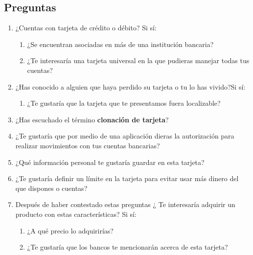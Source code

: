 \documentclass[11pt]{book}
\begin{document}
\subsection{Preguntas}
\begin{enumerate}
	\item ¿Cuentas con tarjeta de crédito o débito? Si sí:
		\begin{enumerate}
			\item ¿Se encuentran asociadas en más de una institución bancaria?
			\item ¿Te interesaría una tarjeta universal en la que pudieras manejar todas
			tus cuentas?
		\end{enumerate}
	\item ¿Has conocido a alguien que haya perdido su tarjeta o tu lo has vivido?Si sí:
		\begin{enumerate}
			\item ¿Te gustaría que la tarjeta que te presentamos fuera localizable?
		\end{enumerate}
	\item ¿Has escuchado el término \textbf{clonación de tarjeta}?
		
	\item ¿Te gustaría que por medio de una aplicación dieras la autorización para realizar movimientos con tus cuentas bancarias?
	
	\item ¿Qué información personal te gustaría guardar en esta tarjeta?
	
	\item ¿Te gustaría definir un límite en la tarjeta para evitar usar más dinero del que dispones o cuentas?
	
	\item Después de haber contestado estas preguntas ¿ Te interesaría adquirir un producto con estas características? Si sí:
		\begin{enumerate}
			\item ¿A qué precio lo adquirirías?
			\item ¿Te gustaría que los bancos te mencionarán acerca de esta tarjeta?
		\end{enumerate}
\end{enumerate}

	
	
	
\end{document}
